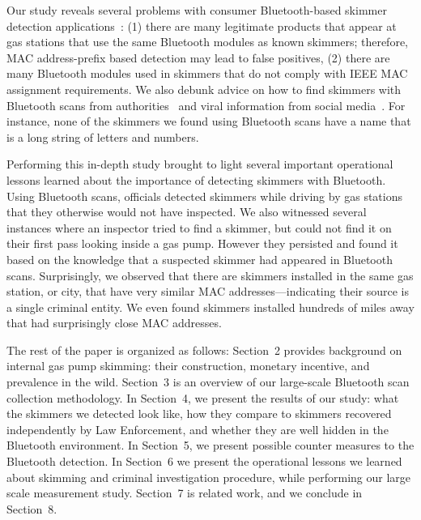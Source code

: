 
 
Our study reveals several problems with consumer Bluetooth-based skimmer
detection applications~\cite{scaifeoakland,sparkfunapp,skimplus}:
%
(1) there are many legitimate products that appear at gas stations that use the
same Bluetooth modules as known skimmers; therefore, MAC address-prefix based detection 
may lead to false positives,
%
(2) there are many Bluetooth modules used in skimmers that do not comply with IEEE MAC
assignment requirements.
%
We also debunk advice on how to find skimmers with Bluetooth scans from authorities~\cite{ag-mn-skimmers} and viral information from social media~\cite{snopesskimmers}.
%
For instance, none of the skimmers we found using Bluetooth scans 
have a name that is a long string of letters and numbers.

Performing this in-depth study brought to light several important operational
lessons learned about the importance of detecting skimmers with Bluetooth.
%
Using Bluetooth scans, officials detected skimmers while
driving by gas stations that they otherwise would not have inspected.
%
We also witnessed several instances where an inspector tried to find a skimmer,
but could not find it on their first pass looking inside a gas pump. However they persisted and found it based on the
knowledge that a suspected skimmer had appeared in
Bluetooth scans.
%
Surprisingly, we observed that there are skimmers installed in the same gas station, or
city, that have very similar MAC addresses---indicating their source is a
single criminal entity.
%
We even found skimmers installed hundreds of miles away that had surprisingly
close MAC addresses.

The rest of the paper is organized as follows: Section~2 provides background
on internal gas pump skimming: their construction, monetary incentive, and prevalence in
the wild. Section~3 is an overview of our large-scale Bluetooth scan collection methodology.
In Section~4, we
present the results of our study: what the skimmers we detected look like, how they compare to skimmers recovered independently by Law Enforcement, and
whether they are well hidden in the Bluetooth environment. In Section~5, we present
possible counter measures to the Bluetooth detection.  In Section~6 we present the operational lessons we
learned about skimming and criminal investigation procedure, while performing
our large scale measurement study. Section~7 is related work, and we conclude in
Section~8.


